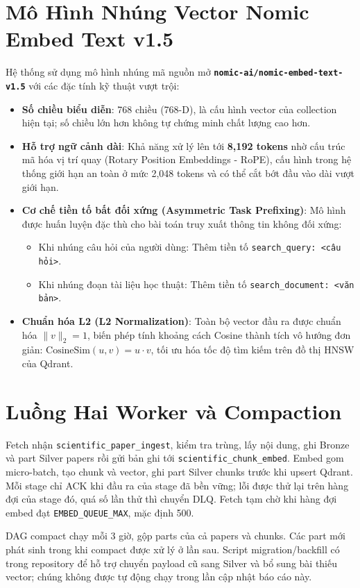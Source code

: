 \section{Mô Hình Nhúng Vector Nomic Embed Text v1.5}

Hệ thống sử dụng mô hình nhúng mã nguồn mở \textbf{\texttt{nomic-ai/nomic-embed-text-v1.5}} với các đặc tính kỹ thuật vượt trội:
\begin{itemize}
  \item \textbf{Số chiều biểu diễn}: 768 chiều (768-D), là cấu hình vector của collection hiện tại; số chiều lớn hơn không tự chứng minh chất lượng cao hơn.
  \item \textbf{Hỗ trợ ngữ cảnh dài}: Khả năng xử lý lên tới \textbf{8,192 tokens} nhờ cấu trúc mã hóa vị trí quay (Rotary Position Embeddings - RoPE), cấu hình trong hệ thống giới hạn an toàn ở mức 2,048 tokens và có thể cắt bớt đầu vào dài vượt giới hạn.
  \item \textbf{Cơ chế tiền tố bất đối xứng (Asymmetric Task Prefixing)}: Mô hình được huấn luyện đặc thù cho bài toán truy xuất thông tin không đối xứng:
    \begin{itemize}
      \item Khi nhúng câu hỏi của người dùng: Thêm tiền tố \texttt{search\_query: <câu hỏi>}.
      \item Khi nhúng đoạn tài liệu học thuật: Thêm tiền tố \texttt{search\_document: <văn bản>}.
    \end{itemize}
  \item \textbf{Chuẩn hóa L2 (L2 Normalization)}: Toàn bộ vector đầu ra được chuẩn hóa $\|v\|_2 = 1$, biến phép tính khoảng cách Cosine thành tích vô hướng đơn giản: $\text{CosineSim}(u, v) = u \cdot v$, tối ưu hóa tốc độ tìm kiếm trên đồ thị HNSW của Qdrant.
\end{itemize}

\section{Luồng Hai Worker và Compaction}
Fetch nhận \texttt{scientific\_paper\_ingest}, kiểm tra trùng, lấy nội dung, ghi Bronze và part Silver papers rồi gửi bản ghi tới \texttt{scientific\_chunk\_embed}. Embed gom micro-batch, tạo chunk và vector, ghi part Silver chunks trước khi upsert Qdrant. Mỗi stage chỉ ACK khi đầu ra của stage đã bền vững; lỗi được thử lại trên hàng đợi của stage đó, quá số lần thử thì chuyển DLQ. Fetch tạm chờ khi hàng đợi embed đạt \texttt{EMBED\_QUEUE\_MAX}, mặc định 500.

DAG compact chạy mỗi 3 giờ, gộp parts của cả papers và chunks. Các part mới phát sinh trong khi compact được xử lý ở lần sau. Script migration/backfill có trong repository để hỗ trợ chuyển payload cũ sang Silver và bổ sung bài thiếu vector; chúng không được tự động chạy trong lần cập nhật báo cáo này.
